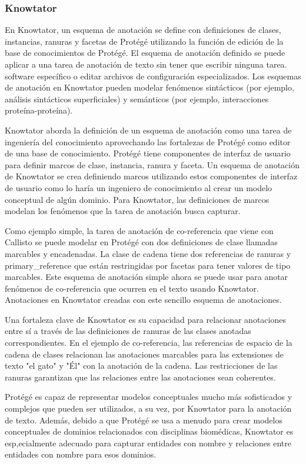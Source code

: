 \subsubsection*{Knowtator}

En Knowtator, un esquema de anotación se define con definiciones de clases, instancias, ranuras y facetas de Protégé utilizando la función de edición de la base de conocimientos de Protégé. El esquema de anotación definido se puede aplicar a una tarea de anotación de texto sin tener que escribir ninguna tarea.
software específico o editar archivos de configuración especializados. Los esquemas de anotación en Knowtator pueden modelar fenómenos sintácticos (por ejemplo, análisis sintácticos superficiales) y semánticos (por ejemplo, interacciones proteína-proteína).

Knowtator aborda la definición de un esquema de anotación como una tarea de ingeniería del conocimiento aprovechando las fortalezas de Protégé como editor de una base de conocimiento. Protégé tiene componentes de interfaz de usuario para definir marcos de clase, instancia, ranura y faceta.
Un esquema de anotación de Knowtator se crea definiendo marcos utilizando estos componentes de interfaz de usuario como lo haría un ingeniero de conocimiento al crear un modelo conceptual de algún dominio. Para Knowtator, las definiciones de marcos modelan los fenómenos que la tarea de anotación busca capturar.

Como ejemplo simple, la tarea de anotación de co-referencia que viene con Callisto se puede modelar en Protégé con dos definiciones de clase llamadas marcables y encadenadas. La clase de cadena tiene dos referencias de ranuras y primary\_reference que están restringidas por facetas para tener valores de tipo marcables. Este esquema de anotación simple ahora se puede usar para anotar fenómenos de co-referencia que ocurren en el texto usando Knowtator. Anotaciones en Knowtator creadas con este sencillo esquema de anotaciones.

Una fortaleza clave de Knowtator es su capacidad para relacionar anotaciones entre sí a través de las definiciones de ranuras de las clases anotadas correspondientes. En el ejemplo de co-referencia, las referencias de espacio de la cadena de clases relacionan las anotaciones marcables para las extensiones de texto "el gato" y "Él" con la anotación de la cadena. Las restricciones de las ranuras garantizan que las relaciones entre las anotaciones sean coherentes.

Protégé es capaz de representar modelos conceptuales mucho más sofisticados y complejos que pueden ser utilizados, a su vez, por Knowtator para la anotación de texto. Además, debido a que Protégé se usa a menudo para crear modelos conceptuales de dominios relacionados con disciplinas biomédicas, Knowtator es esp,ecialmente adecuado para capturar entidades con nombre y relaciones entre entidades con nombre para esos dominios.

